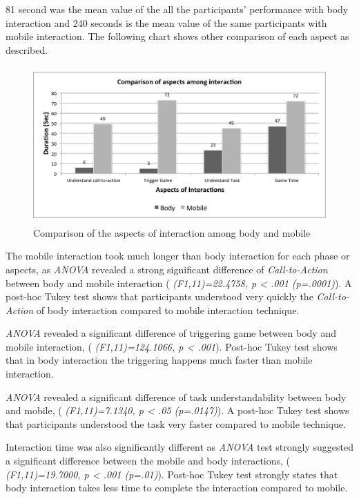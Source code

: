 \begin{itemize}
81 second was the mean value of the all the participants’ performance with body interaction and 240 seconds is the mean value of the same participants with mobile interaction. The following chart shows other comparison of each aspect as described.


\begin{figure}[H]
\centering
\includegraphics[width=12cm,height=6cm]{Figures/6/mobile_body_aspect}%
 \caption{Comparison of the aspects of interaction among body and mobile }%
 \label{fig:mobile_body_aspect}%
\end{figure}


The mobile interaction took much longer than body interaction for each phase or aspects, as \emph{ANOVA} revealed a strong significant difference of \emph{Call-to-Action} between body and mobile interaction ( \emph{(F1,11)=22.4758, p < .001 (p=.0001)}). A post-hoc Tukey test shows that participants understood very quickly the \emph{Call-to-Action} of body interaction compared to mobile interaction technique.

\emph{ANOVA} revealed a significant difference of triggering game between body and mobile interaction, ( \emph{(F1,11)=124.1066, p < .001}). Post-hoc Tukey test shows that in body interaction the triggering happens much faster than mobile interaction. 

\emph{ANOVA} revealed a significant difference of task understandability between body and mobile, ( \emph{(F1,11)=7.1340, p < .05 (p=.0147)}). A post-hoc Tukey test shows that participants understood the task very faster compared to mobile technique.

Interaction time was also significantly different as \emph{ANOVA} test strongly suggested a significant difference between the mobile and body interactions, ( \emph{(F1,11)=19.7000, p < .001 (p=.01)}). Post-hoc Tukey test strongly states that body interaction takes less time to complete the interaction compared to mobile.

\end{itemize}



